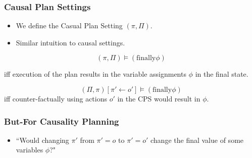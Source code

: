 \documentclass{beamer}
\theoremstyle{plain}
\theoremstyle{definition}
\begin{document}
\begin{frame}
\frametitle{Causal Plan Settings}
\begin{itemize}
\item We define the Casual Plan Setting $(\pi, \Pi)$.
\item Similar intuition to causal settings.
\newline
\end{itemize}


\[
(\pi,\Pi)\models (\textrm{finally} \phi)
\]

iff execution of the plan results in the variable assignments $\phi$ in the final state.

\[
(\Pi, \pi)[\pi'\leftarrow o'] \models (\textrm{finally} \phi)
\]
iff counter-factually using actions $o'$ in the CPS would result in $\phi$.

\end{frame}




\begin{frame}
\frametitle{But-For Causality Planning}
\begin{itemize}
\item ``Would changing $\pi'$ from $\pi'=o$ to $\pi'= o'$ change the final value of some variables $\phi$?"
\end{itemize}

\end{frame}
\end{document}
